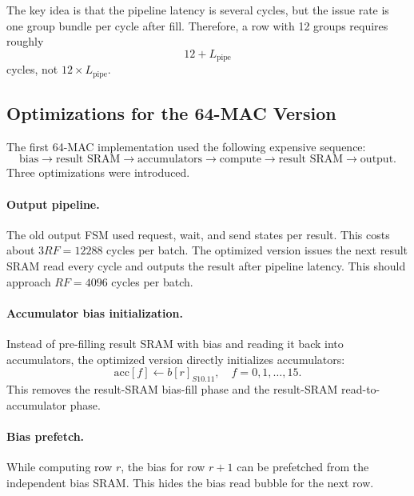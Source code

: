 \documentclass[11pt,a4paper]{article}
\begin{document}
The key idea is that the pipeline latency is several cycles, but the issue rate is one group bundle per cycle after fill. Therefore, a row with 12 groups requires roughly
\begin{equation}
    12 + L_{\mathrm{pipe}}
\end{equation}
cycles, not $12 \times L_{\mathrm{pipe}}$.

\subsection{Optimizations for the 64-MAC Version}

The first 64-MAC implementation used the following expensive sequence:
\begin{equation*}
    \text{bias} \rightarrow \text{result SRAM} \rightarrow \text{accumulators} \rightarrow \text{compute} \rightarrow \text{result SRAM} \rightarrow \text{output}.
\end{equation*}
Three optimizations were introduced.

\paragraph{Output pipeline.}
The old output FSM used request, wait, and send states per result. This costs about $3RF=12288$ cycles per batch. The optimized version issues the next result SRAM read every cycle and outputs the result after pipeline latency. This should approach $RF=4096$ cycles per batch.

\paragraph{Accumulator bias initialization.}
Instead of pre-filling result SRAM with bias and reading it back into accumulators, the optimized version directly initializes accumulators:
\begin{equation}
    \mathrm{acc}[f] \leftarrow b[r]_{S10.11}, \quad f=0,1,\ldots,15.
\end{equation}
This removes the result-SRAM bias-fill phase and the result-SRAM read-to-accumulator phase.

\paragraph{Bias prefetch.}
While computing row $r$, the bias for row $r+1$ can be prefetched from the independent bias SRAM. This hides the bias read bubble for the next row.
\end{document}
